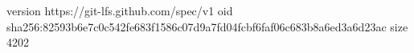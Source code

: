 version https://git-lfs.github.com/spec/v1
oid sha256:82593b6e7c0c542fe683f1586c07d9a7fd04fcbf6faf06c683b8a6ed3a6d23ac
size 4202
